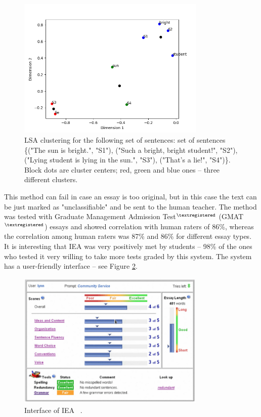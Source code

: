 \begin{itemize}
\begin{figure}[h!]
  \centering
  \includegraphics[width=0.8\textwidth]{img/LSAExample}
    \caption{LSA clustering for the following set of sentences: set of sentences \{("The sun is bright.", "S1"), ("Such a bright, bright student!", "S2"), ("Lying student is lying in the sun.", "S3"), ("That's a lie!", "S4")\}. Block dots are cluster centers; red, green and blue ones -- three different clusters. \label{fig:LSAExample}}
\end{figure}

\end{itemize}

This method can fail in case an essay is too original, but in this case the text can be just marked as "unclassifiable" and be sent to the human teacher. The method was tested with Graduate Management Admission Test$^{\tiny{\textregistered}}$ (GMAT$^{\tiny{\textregistered}}$) essays and showed correlation with human raters of 86\%, whereas the correlation among human raters was 87\% and 86\% for different essay types. It is interesting that IEA was very positively met by students -- 98\% of the ones who tested it very willing to take more tests graded by this system. The system has a user-friendly interface -- see Figure \ref{fig:IEAInt}. \\

\begin{figure}[h!]
  \centering
  \includegraphics[width=0.8\textwidth]{img/IEAInt}
    \caption{Interface of IEA ~\cite{Dikli}.\label{fig:IEAInt}}
\end{figure}

